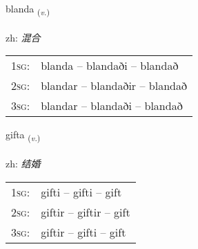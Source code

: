 \documentclass[frontgrid, backgrid]{flacards}\usepackage[]{graphicx}\usepackage[]{color}
\begin{document}
\renewcommand{\blhead}{\vskip5pt {\small\bfseries\footnotesize Sagnorð | 动词 }}
\renewcommand{\bcfoot}{\vskip5pt \hspace{2pt}{\small\bfseries\footnotesize 2K}}


{blanda \small{\textsubscript{(\textit{v.})}} \\[1ex] %
\textphonetic{[planta]} \\
zh: \emph{混合} \\  [2ex]
\renewcommand*{\arraystretch}{0.8}
\begin{tabular}{p{1cm}l}
\textsc{1sg}: & blanda -- blandaði -- blandað \\ 
\textsc{2sg}: & blandar -- blandaðir -- blandað \\ 
\textsc{3sg}: & blandar -- blandaði -- blandað \\ 
\end{tabular}
}

\renewcommand{\flhead}{\vskip5pt \fboxsep=0pt {\small\bfseries\footnotesize Sagnorð | 动词}}
\renewcommand{\fcfoot}{\vskip5pt \fboxsep=0pt \hspace{2pt}{\small\bfseries\footnotesize 2K}}

\renewcommand{\blhead}{\vskip5pt {\small\bfseries\footnotesize Sagnorð | 动词 }}
\renewcommand{\bcfoot}{\vskip5pt \hspace{2pt}{\small\bfseries\footnotesize 2K}}


{gifta \small{\textsubscript{(\textit{v.})}} \\[1ex] %
\textphonetic{[cɪfta]} \\
zh: \emph{结婚} \\  [2ex]
\renewcommand*{\arraystretch}{0.8}
\begin{tabular}{p{1cm}l}
\textsc{1sg}: & gifti -- gifti -- gift \\ 
\textsc{2sg}: & giftir -- giftir -- gift \\ 
\textsc{3sg}: & giftir -- gifti -- gift \\ 
\end{tabular}
}
\end{document}
